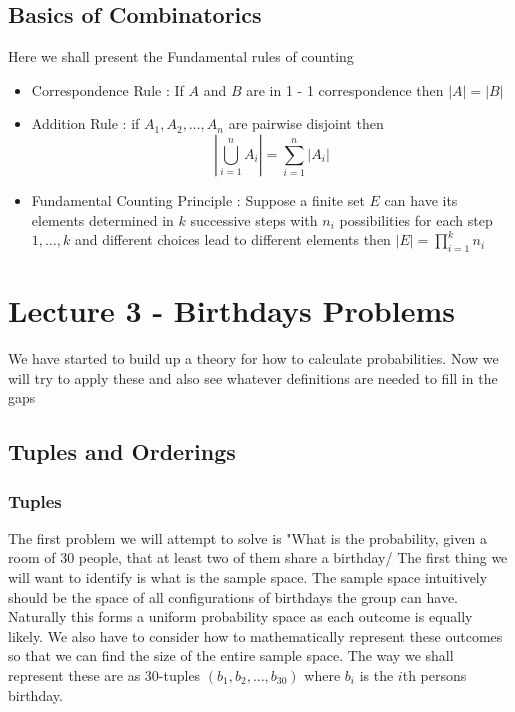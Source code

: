 \documentclass{article}
\begin{document}
\subsection{Basics of Combinatorics}
Here we shall present the Fundamental rules of counting
\begin{itemize}
    \item Correspondence Rule : If $A$ and $B$ are in 1 - 1 correspondence then $|A| = |B|$
    \item Addition Rule : if $A_{1},A_{2},\dots,A_{n}$ are pairwise disjoint then
          \[\left|\bigcup_{i=1}^{n}A_{i} \right| = \sum_{i=1}^{n}|A_{i}|\]
        \item Fundamental Counting Principle : Suppose a finite set $E$ can have its elements determined in $k$ successive steps with $n_{i}$ possibilities for each step $1,\dots,k$ and different choices lead to different elements then $|E| = \prod_{i = 1}^k n_{i}$  
\end{itemize}

\section{Lecture 3 - Birthdays Problems}
We have started to build up a theory for how to calculate probabilities. Now we will try to apply these and also see whatever definitions are needed to fill in the gaps
\subsection{Tuples and Orderings}
\subsubsection{Tuples}
The first problem we will attempt to solve is "What is the probability, given a room of 30 people, that at least two of them share a birthday/ The first thing we will want to identify is what is the sample space. The sample space intuitively should be the space of all configurations of birthdays the group can have. Naturally this forms a uniform probability space as each outcome is equally likely. We also have to consider how to mathematically represent these outcomes so that we can find the size of the entire sample space. The way we shall represent these are as 30-tuples $(b_{1},b_{2},\dots,b_{30})$ where $b_{i}$ is the $i$th persons birthday.
\end{document}
